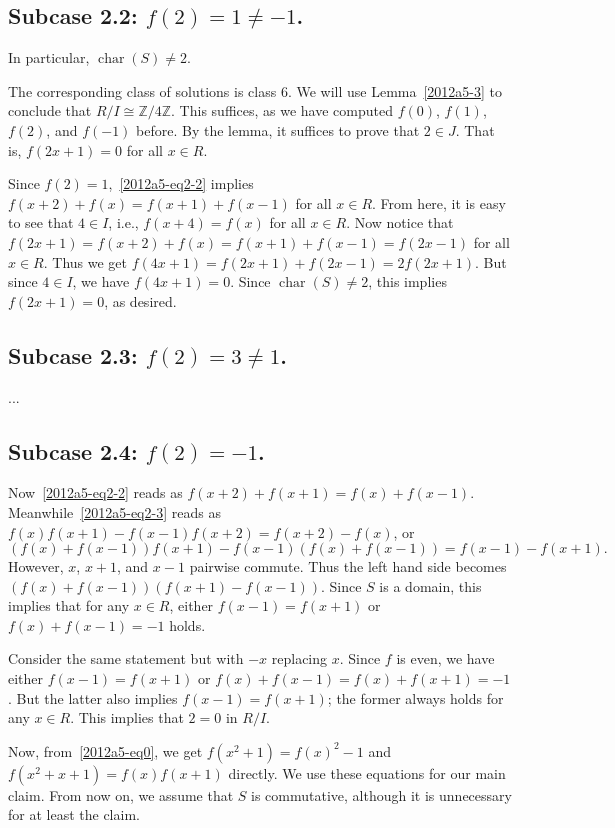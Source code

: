 \documentclass{article}
\newcommand{\Z}{\mathbb{Z}}
\DeclareMathOperator{\rchar}{char}
\begin{document}
\subsection*{Subcase 2.2: $f(2) = 1 \neq -1$.}

In particular, $\rchar(S) \neq 2$.

The corresponding class of solutions is class 6.
We will use Lemma~\ref{2012a5-3} to conclude that $R/I \cong \Z/4\Z$.
This suffices, as we have computed $f(0)$, $f(1)$, $f(2)$, and $f(-1)$ before.
By the lemma, it suffices to prove that $2 \in J$.
That is, $f(2x + 1) = 0$ for all $x \in R$.

Since $f(2) = 1$,~\eqref{2012a5-eq2-2} implies $f(x + 2) + f(x) = f(x + 1) + f(x - 1)$ for all $x \in R$.
From here, it is easy to see that $4 \in I$, i.e., $f(x + 4) = f(x)$ for all $x \in R$.
Now notice that $f(2x + 1) = f(x + 2) + f(x) = f(x + 1) + f(x - 1) = f(2x - 1)$ for all $x \in R$.
Thus we get $f(4x + 1) = f(2x + 1) + f(2x - 1) = 2 f(2x + 1)$.
But since $4 \in I$, we have $f(4x + 1) = 0$.
Since $\rchar(S) \neq 2$, this implies $f(2x + 1) = 0$, as desired.


\subsection*{Subcase 2.3: $f(2) = 3 \neq 1$.}

...


\subsection*{Subcase 2.4: $f(2) = -1$.}

Now~\eqref{2012a5-eq2-2} reads as $f(x + 2) + f(x + 1) = f(x) + f(x - 1)$.
Meanwhile~\eqref{2012a5-eq2-3} reads as $f(x) f(x + 1) - f(x - 1) f(x + 2) = f(x + 2) - f(x)$, or
\[ (f(x) + f(x - 1)) f(x + 1) - f(x - 1) (f(x) + f(x - 1)) = f(x - 1) - f(x + 1). \]
However, $x$, $x + 1$, and $x - 1$ pairwise commute.
Thus the left hand side becomes $(f(x) + f(x - 1)) (f(x + 1) - f(x - 1))$.
Since $S$ is a domain, this implies that for any $x \in R$, either $f(x - 1) = f(x + 1)$ or $f(x) + f(x - 1) = -1$ holds.

Consider the same statement but with $-x$ replacing $x$.
Since $f$ is even, we have either $f(x - 1) = f(x + 1)$ or $f(x) + f(x - 1) = f(x) + f(x + 1) = -1$.
But the latter also implies $f(x - 1) = f(x + 1)$; the former always holds for any $x \in R$.
This implies that $2 = 0$ in $R/I$.


Now, from~\eqref{2012a5-eq0}, we get $f(x^2 + 1) = f(x)^2 - 1$ and $f(x^2 + x + 1) = f(x) f(x + 1)$ directly.
We use these equations for our main claim.
From now on, we assume that $S$ is commutative, although it is unnecessary for at least the claim.
\end{document}
